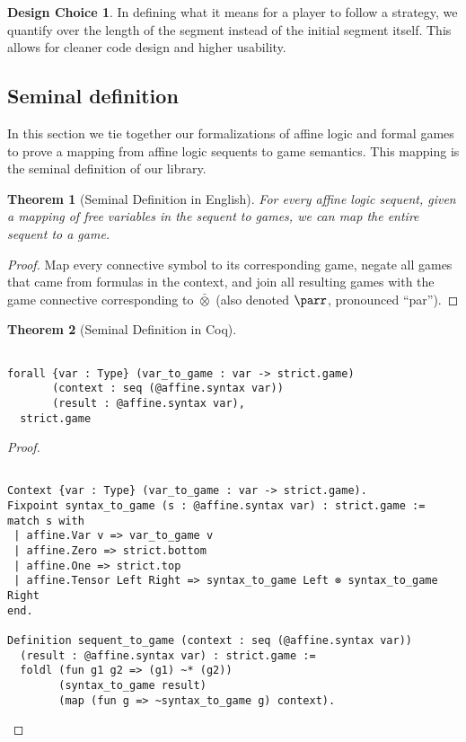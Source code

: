 \documentclass{article}
\newtheorem{thm}{Theorem}
\theoremstyle{definition}
\newtheorem*{designchoice}{Design Choice}
\begin{document}
\begin{designchoice}
In defining what it means for a player to follow a strategy, we quantify over the length of the segment instead of the initial segment itself. This allows for cleaner code design and higher usability. 
\end{designchoice}

\subsection{Seminal definition}

In this section we tie together our formalizations of affine logic and formal games to prove a mapping from affine logic sequents to game semantics. This mapping is the seminal definition of our library.

\setcounter{thmseminal}{\value{thm}}
\begin{thm}[Seminal Definition in English] For every affine logic sequent, given a mapping of free variables in the sequent to games, we can map the entire sequent to a game. 
\end{thm}
\begin{proof} Map every connective symbol to its corresponding game, negate all games that came from formulas in the context, and join all resulting games with the game connective corresponding to $\bar\otimes$ (also denoted $\parr$, pronounced ``par'').
\end{proof}

\setcounter{savethm}{\value{thm}}
\setcounter{thm}{\value{thmseminal}}
\begin{thm}[Seminal Definition in Coq]
\begin{verbatim}

forall {var : Type} (var_to_game : var -> strict.game)
       (context : seq (@affine.syntax var)) 
       (result : @affine.syntax var),
  strict.game
\end{verbatim}
\end{thm}
\begin{proof}
\begin{verbatim}

Context {var : Type} (var_to_game : var -> strict.game).
Fixpoint syntax_to_game (s : @affine.syntax var) : strict.game :=
match s with
 | affine.Var v => var_to_game v
 | affine.Zero => strict.bottom
 | affine.One => strict.top
 | affine.Tensor Left Right => syntax_to_game Left ⊗ syntax_to_game Right
end.

Definition sequent_to_game (context : seq (@affine.syntax var)) 
  (result : @affine.syntax var) : strict.game :=
  foldl (fun g1 g2 => (g1) ~* (g2))
        (syntax_to_game result)
        (map (fun g => ~syntax_to_game g) context).
\end{verbatim}
\end{proof}
\end{document}
